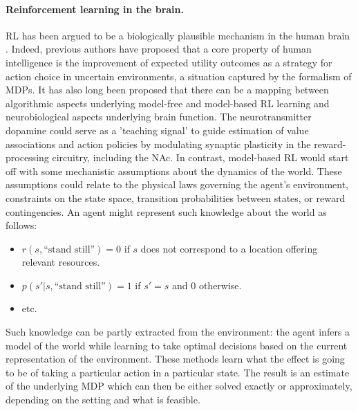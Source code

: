 \documentclass[10pt,letterpaper]{article}
\begin{document}


\paragraph*{Reinforcement learning in the brain.}
RL has been argued to be a biologically plausible mechanism in the human brain
\citep{doherty2015structure, daw2014algorithmic}.
Indeed,
previous authors have proposed
\citep{gershman2015computational} that a core property of human intelligence is the improvement
of expected utility outcomes as a strategy for action choice in uncertain
environments, a situation captured by the formalism of MDPs.
It has also long been proposed \citep{dayan2008decision} that there
can be a mapping between algorithmic aspects
underlying model-free and model-based RL learning
and neurobiological aspects underlying brain function.
The neurotransmitter dopamine could serve
as a 'teaching signal' to guide estimation of value associations
and action policies by modulating
synaptic plasticity in the reward-processing circuitry, including the NAc.
In contrast, model-based RL would start off with some mechanistic assumptions about the dynamics of the world.
These assumptions could relate to the
physical laws governing the agent's environment, constraints on the state space, transition probabilities between states, or reward contingencies.
An agent might represent such knowledge about the world as follows:
\begin{itemize}
\item $r(s, \text{``stand still''}) = 0$ if $s$ does not correspond to a location
offering relevant resources.
\item $p(s'|s,\text{``stand still''}) = 1$ if $s'=s$ and $0$ otherwise.
\item etc.
\end{itemize}
Such knowledge can be partly extracted from the environment: the agent infers a model of the world while learning to take optimal decisions based on the current representation of the environment. These methods learn what the effect is going to be of taking a particular action in a particular state. The result is an estimate of the underlying MDP which can then be either solved exactly or approximately, depending on the setting and what is feasible.
\end{document}
